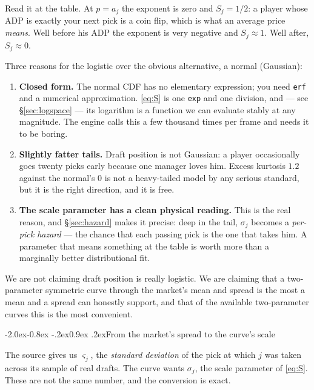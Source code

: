 \documentclass[10pt,a4paper]{article}
\makeatletter
\theoremstyle{plain}
\theoremstyle{definition}
\theoremstyle{remark}
\newcommand{\code}[1]{\texttt{\small #1}}
\renewcommand\subsection{\@startsection{subsection}{2}{\z@}%
  {-2.0ex\@plus -0.8ex \@minus -.2ex}{0.9ex \@plus .2ex}{\normalfont\large\bfseries}}
\makeatother
\begin{document}
Read it at the table. At $p = a_j$ the exponent is zero and $S_j = 1/2$: a player whose
ADP is exactly your next pick is a coin flip, which is what an average price
\emph{means}. Well before his ADP the exponent is very negative and $S_j \approx 1$.
Well after, $S_j \approx 0$.

Three reasons for the logistic over the obvious alternative, a normal (Gaussian):

\begin{enumerate}
\item \textbf{Closed form.} The normal CDF has no elementary expression; you need
\code{erf} and a numerical approximation. \eqref{eq:S} is one \code{exp} and one
division, and --- see \S\ref{sec:logspace} --- its logarithm is a function we can
evaluate stably at any magnitude. The engine calls this a few thousand times per frame
and needs it to be boring.

\item \textbf{Slightly fatter tails.} Draft position is not Gaussian: a player
occasionally goes twenty picks early because one manager loves him. Excess kurtosis
$1.2$ against the normal's $0$ is not a heavy-tailed model by any serious standard, but
it is the right direction, and it is free.

\item \textbf{The scale parameter has a clean physical reading.} This is the real
reason, and \S\ref{sec:hazard} makes it precise: deep in the tail, $\sigma_j$ becomes
a \emph{per-pick hazard} --- the chance that each passing pick is the one that takes
him. A parameter that means something at the table is worth more than a marginally
better distributional fit.
\end{enumerate}

We are not claiming draft position is really logistic. We are claiming that a
two-parameter symmetric curve through the market's mean and spread is the most a
mean and a spread can honestly support, and that of the available two-parameter
curves this is the most convenient.

\subsection{From the market's spread to the curve's scale}
\label{sec:sigma}

The source gives us $\varsigma_j$, the \emph{standard deviation} of the pick at which
$j$ was taken across its sample of real drafts. The curve wants $\sigma_j$, the scale
parameter of \eqref{eq:S}. These are not the same number, and the conversion is exact.
\end{document}
